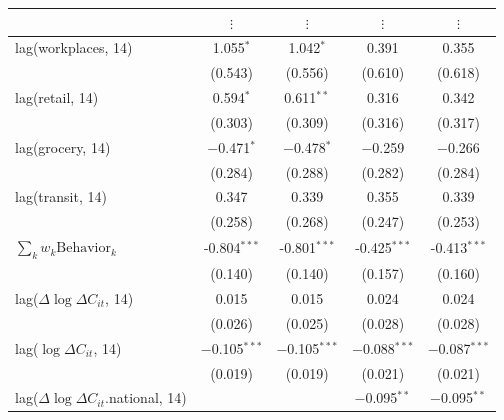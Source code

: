 \documentclass{beamer}
\def\bcolor{\color{forestgreen(web)}}
\def\icolor{\color{magenta}}
\begin{document}
\begin{frame}
\begin{table}[!htbp]
\begin{minipage}{\linewidth}
{\begin{tabular}{@{\extracolsep{1pt}}lcccc}
& $\vdots$ &$\vdots$ &$\vdots$ &$\vdots$    \\\hline
    {\bcolor  lag(workplaces, 14)} & 1.055$^{*}$ & 1.042$^{*}$ & 0.391 & 0.355 \\ 
  & (0.543) & (0.556) & (0.610) & (0.618) \\ 
  {\bcolor  lag(retail, 14)} & 0.594$^{*}$ & 0.611$^{**}$ & 0.316 & 0.342 \\ 
  & (0.303) & (0.309) & (0.316) & (0.317) \\ 
  {\bcolor  lag(grocery, 14) }& $-$0.471$^{*}$ & $-$0.478$^{*}$ & $-$0.259 & $-$0.266 \\ 
  & (0.284) & (0.288) & (0.282) & (0.284) \\ 
  {\bcolor  lag(transit, 14)} & 0.347 & 0.339 & 0.355 & 0.339 \\ 
  & (0.258) & (0.268) & (0.247) & (0.253) \\  \hline \hline
  {\bcolor  $\sum_k w_k \mathrm{Behavior}_k$ }&  {\bcolor -0.804$^{***}$} &  {\bcolor -0.801$^{***}$} & {\bcolor  -0.425$^{***}$} &  {\bcolor -0.413$^{***}$} \\ 
 & (0.140) & (0.140) & (0.157) & (0.160) \\ %
 \hline \hline
  lag($\Delta \log \Delta C_{it}$, 14) & 0.015 & 0.015 & 0.024 & 0.024 \\ 
  & (0.026) & (0.025) & (0.028) & (0.028) \\ 
   {\icolor  lag($\log \Delta C_{it}$, 14) }&   {\icolor $-$0.105$^{***}$} &   {\icolor $-$0.105$^{***}$} &   {\icolor $-$0.088$^{***}$} &   {\icolor $-$0.087$^{***}$} \\ 
  & (0.019) & (0.019) & (0.021) & (0.021) \\ 
  lag($\Delta \log \Delta C_{it}$.national, 14) &  &  & $-$0.095$^{**}$ & $-$0.095$^{**}$ \\ 

\end{tabular}}
\end{minipage}
\end{table}
\end{frame}
\end{document}
